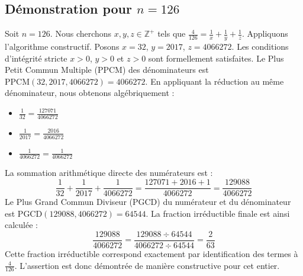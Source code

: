\documentclass[11pt,a4paper]{article}
\begin{document}
\subsection{Démonstration pour $n = 126$}
Soit $n = 126$. Nous cherchons $x, y, z \in \mathbb{Z}^{+}$ tels que $\frac{4}{126} = \frac{1}{x} + \frac{1}{y} + \frac{1}{z}$.
Appliquons l'algorithme constructif. Posons $x = 32$, $y = 2017$, $z = 4066272$.
Les conditions d'intégrité stricte $x > 0$, $y > 0$ et $z > 0$ sont formellement satisfaites.
Le Plus Petit Commun Multiple (PPCM) des dénominateurs est $\text{PPCM}(32, 2017, 4066272) = 4066272$.
En appliquant la réduction au même dénominateur, nous obtenons algébriquement :
\begin{itemize}
    \item $\frac{1}{32} = \frac{127071}{4066272}$
    \item $\frac{1}{2017} = \frac{2016}{4066272}$
    \item $\frac{1}{4066272} = \frac{1}{4066272}$
\end{itemize}
La sommation arithmétique directe des numérateurs est :
$$ \frac{1}{32} + \frac{1}{2017} + \frac{1}{4066272} = \frac{127071 + 2016 + 1}{4066272} = \frac{129088}{4066272} $$
Le Plus Grand Commun Diviseur (PGCD) du numérateur et du dénominateur est $\text{PGCD}(129088, 4066272) = 64544$.
La fraction irréductible finale est ainsi calculée :
$$ \frac{129088}{4066272} = \frac{129088 \div 64544}{4066272 \div 64544} = \frac{2}{63} $$
Cette fraction irréductible correspond exactement par identification des termes à $\frac{4}{126}$. L'assertion est donc démontrée de manière constructive pour cet entier.
\end{document}
